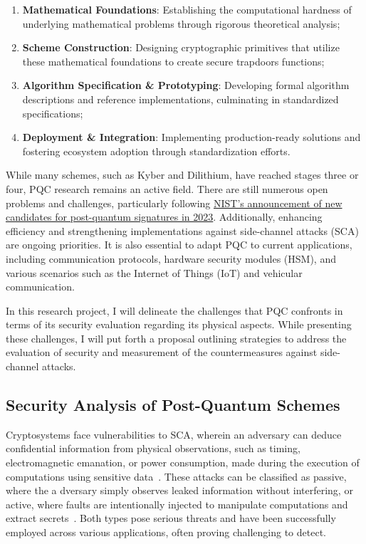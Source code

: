 \documentclass[11pt, a4paper]{article}
\begin{document}
\begin{enumerate}
\setlength{\itemsep}{0.1pt}
\item \textbf{Mathematical Foundations}: Establishing the computational 
hardness of underlying mathematical problems through rigorous 
theoretical analysis;
\item \textbf{Scheme Construction}: Designing cryptographic primitives 
that utilize these mathematical foundations to create secure trapdoors 
functions;
\item \textbf{Algorithm Specification \& Prototyping}: Developing formal 
algorithm descriptions and reference implementations, culminating in 
standardized specifications;
\item \textbf{Deployment \& Integration}: Implementing production-ready 
solutions and fostering ecosystem adoption through standardization 
efforts.
\end{enumerate}
While many schemes, such as Kyber and Dilithium, have reached stages three or four, 
PQC research remains an active field. There are still numerous open problems and challenges, 
particularly following \href{https://www.nist.gov/news-events/news/2023/07/nist-announces-additional-digital-signature-candidates-pqc-standardization}
{NIST's announcement of new candidates for post-quantum signatures in 2023}. 
Additionally, enhancing efficiency and strengthening implementations against side-channel attacks (SCA) 
are ongoing priorities. It is also essential to adapt PQC to current applications, including communication protocols, 
hardware security modules (HSM), and various scenarios such as the Internet of 
Things (IoT) and vehicular communication.

In this research project, I will delineate the challenges that PQC confronts 
in terms of its security evaluation regarding its physical aspects. While presenting these challenges, 
I will put forth a proposal outlining strategies to address the evaluation of security and measurement of 
the countermeasures against side-channel attacks. 

\subsection*{Security Analysis of Post-Quantum Schemes}\label{sec:an}\vspace{-0.1cm}

Cryptosystems face vulnerabilities to SCA, wherein an adversary can deduce 
confidential information from physical observations, such as timing,
electromagnetic emanation, or power consumption, made during the execution of 
computations using sensitive data~\cite{brumley2005remote, 10.1007/3-540-48405-1_25}.
These attacks can be classified as passive, where the a
dversary simply observes leaked information without interfering, or active, 
where faults are intentionally injected to manipulate computations and extract 
secrets~\cite{4599557,6076462}. Both types pose serious threats and have been successfully employed 
across various applications, often proving challenging to detect.
\end{document}
